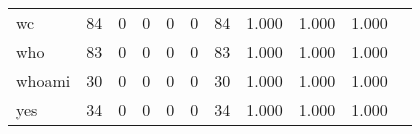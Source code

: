 \begin{longtable}{lp{1.2cm}p{1.2cm}p{1.2cm}p{1.2cm}p{1.2cm}p{1.2cm}p{1.2cm}p{1.2cm}p{1.2cm}p{1.2cm}}
wc        &                                    84 &                                                  0 &                                                  0 &                                                  0 &                                                  0 &                                                 84 &                                              1.000 &                                              1.000 &                                              1.000 \\
who       &                                    83 &                                                  0 &                                                  0 &                                                  0 &                                                  0 &                                                 83 &                                              1.000 &                                              1.000 &                                              1.000 \\
whoami    &                                    30 &                                                  0 &                                                  0 &                                                  0 &                                                  0 &                                                 30 &                                              1.000 &                                              1.000 &                                              1.000 \\
yes       &                                    34 &                                                  0 &                                                  0 &                                                  0 &                                                  0 &                                                 34 &                                              1.000 &                                              1.000 &                                              1.000 \\
\end{longtable}
